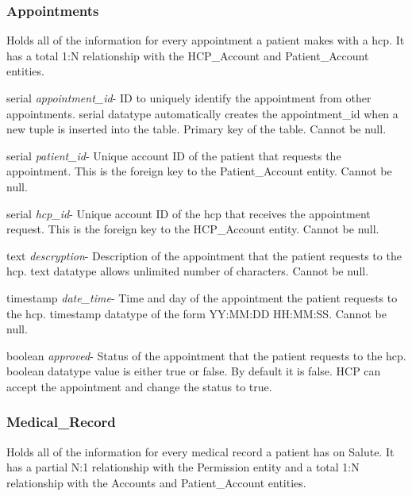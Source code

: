 \subsubsection{Appointments}
Holds all of the information for every appointment a patient makes with a hcp.  It has a total 1:N relationship with the HCP\_Account and Patient\_Account entities.

\begin{description}
\item serial \textit{appointment\_id}- ID to uniquely identify the appointment from other appointments. serial datatype automatically creates the appointment\_id when a new tuple is inserted into the table.  Primary key of the table.  Cannot be null.
\item serial \textit{patient\_id}-  Unique account ID of the patient that requests the appointment.  This is the foreign key to the Patient\_Account entity.  Cannot be null.
\item serial \textit{hcp\_id}- Unique account ID of the hcp that receives the appointment request.  This is the foreign key to the HCP\_Account entity.  Cannot be null.
\item text \textit{descryption}- Description of the appointment that the patient requests to the hcp.  text datatype allows unlimited number of characters.  Cannot be null.
\item timestamp \textit{date\_time}- Time and day of the appointment the patient requests to the hcp.  timestamp datatype of the form YY:MM:DD HH:MM:SS.  Cannot be null.
\item boolean \textit{approved}- Status of the appointment that the patient requests to the hcp.  boolean datatype value is either true or false.  By default it is false.  HCP can accept the appointment and change the status to true.
\end{description}

\subsubsection{Medical\_Record}
Holds all of the information for every medical record a patient has on Salute.  It has a partial N:1 relationship with the Permission entity and a total 1:N relationship with the Accounts and Patient\_Account entities.

